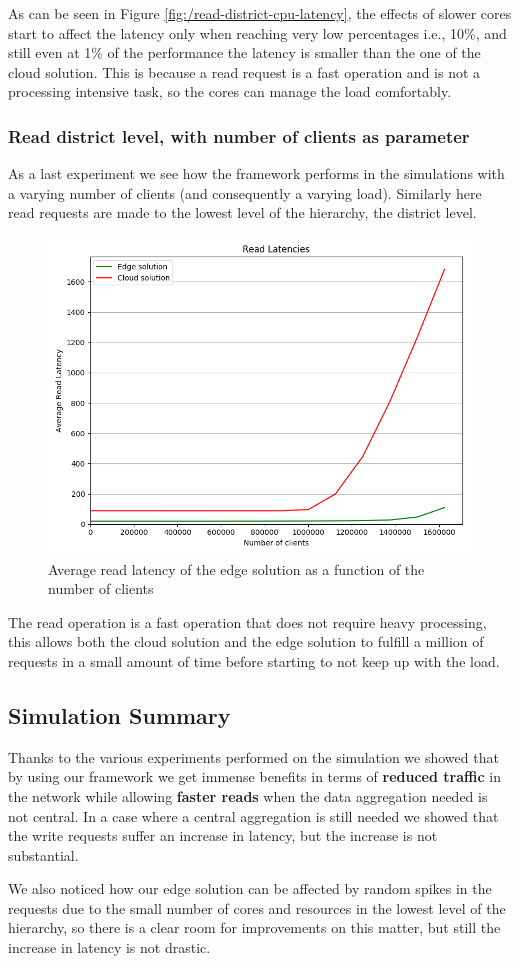 As can be seen in Figure \ref{fig:/read-district-cpu-latency}, the effects of slower cores start to affect the latency only when reaching very low percentages i.e., 10\%, and still even at 1\% of the performance the latency is smaller than the one of the cloud solution. This is because a read request is a fast operation and is not a processing intensive task, so the cores can manage the load comfortably.

\subsubsection{Read district level, with number of clients as parameter}
As a last experiment we see how the framework performs in the simulations with a varying number of clients (and consequently a varying load).
Similarly here read requests are made to the lowest level of the hierarchy, the district level.

\begin{figure}[H]
    \centering
    \includegraphics[width=0.86\linewidth]{Figures/Evaluation/read-district-clients-latency.png}
    \caption{Average read latency of the edge solution as a function of the number of clients}
    \label{fig:/read-district-clients-latency}
\end{figure}

The read operation is a fast operation that does not require heavy processing, this allows both the cloud solution and the edge solution to fulfill a million of requests in a small amount of time before starting to not keep up with the load.

\subsection{Simulation Summary}
Thanks to the various experiments performed on the simulation we showed that by using our framework we get immense benefits in terms of \textbf{reduced traffic} in the network while allowing \textbf{faster reads} when the data aggregation needed is not central.
In a case where a central aggregation is still needed we showed that the write requests suffer an increase in latency, but the increase is not substantial.

We also noticed how our edge solution can be affected by random spikes in the requests due to the small number of cores and resources in the lowest level of the hierarchy, so there is a clear room for improvements on this matter, but still the increase in latency is not drastic.

